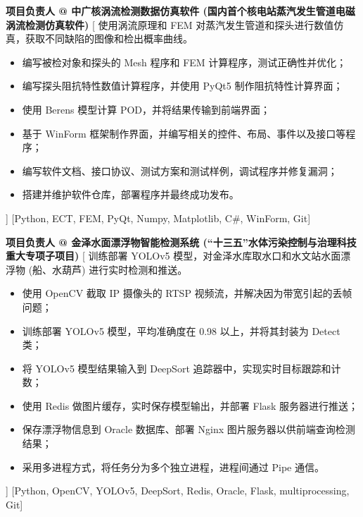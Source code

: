 \begin{experiences}
    {\textbf{项目负责人 @ 中广核涡流检测数据仿真软件 (国内首个核电站蒸汽发生管道电磁涡流检测仿真软件)}}%
    [
    使用涡流原理和 FEM 对蒸汽发生管道和探头进行数值仿真，获取不同缺陷的图像和检出概率曲线。
        \begin{itemize}
            \item {编写被检对象和探头的 Mesh 程序和 FEM 计算程序，测试正确性并优化；}
            \item {编写探头阻抗特性数值计算程序，并使用 PyQt5 制作阻抗特性计算界面；}
            \item {使用 Berens 模型计算 POD，并将结果传输到前端界面；}
            \item {基于 WinForm 框架制作界面，并编写相关的控件、布局、事件以及接口等程序；}
            \item {编写软件文档、接口协议、测试方案和测试样例，调试程序并修复漏洞；}
            \item {搭建并维护软件仓库，部署程序并最终成功发布。}
        \end{itemize}
    ]
    [Python, ECT, FEM, PyQt, Numpy, Matplotlib, C\#, WinForm, Git]
    \separator{0.5ex}

    {\textbf{项目负责人 @ 金泽水面漂浮物智能检测系统 (``十三五''水体污染控制与治理科技重大专项子项目)}}%
    [
    训练部署 YOLOv5 模型，对金泽水库取水口和水文站水面漂浮物 (船、水葫芦) 进行实时检测和推送。
        \begin{itemize}
            \item {使用 OpenCV 截取 IP 摄像头的 RTSP 视频流，并解决因为带宽引起的丢帧问题；}
            \item {训练部署 YOLOv5 模型，平均准确度在 0.98 以上，并将其封装为 Detect 类；}
            \item {将 YOLOv5 模型结果输入到 DeepSort 追踪器中，实现实时目标跟踪和计数；}
            \item {使用 Redis 做图片缓存，实时保存模型输出，并部署 Flask 服务器进行推送；}
            \item {保存漂浮物信息到 Oracle 数据库、部署 Nginx 图片服务器以供前端查询检测结果；}
            \item {采用多进程方式，将任务分为多个独立进程，进程间通过 Pipe 通信。}
        \end{itemize}]
    [Python, OpenCV, YOLOv5, DeepSort, Redis, Oracle, Flask, multiprocessing, Git]
\end{experiences}